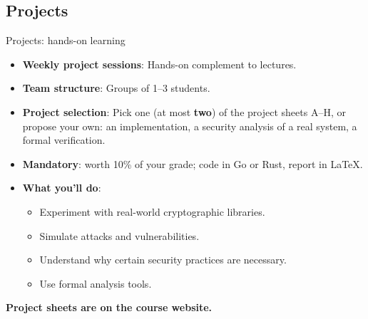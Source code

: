\ifdefined\PRESENTATION\else\PassOptionsToClass{handout}{beamer}\fi\documentclass[aspectratio=169, lualatex]{beamer}
\begin{document}
\subsection{Projects}

\begin{frame}{Projects: hands-on learning}
	\begin{itemize}[<+->]
		\item \textbf{Weekly project sessions}: Hands-on complement to lectures.
		\item \textbf{Team structure}: Groups of 1--3 students.
		\item \textbf{Project selection}: Pick one (at most \textbf{two}) of the project sheets A--H, or propose your own: an implementation, a security analysis of a real system, a formal verification.
		\item \textbf{Mandatory}: worth 10\% of your grade; code in Go or Rust, report in \LaTeX.
		\item \textbf{What you'll do}:
		      \begin{itemize}
			      \item Experiment with real-world cryptographic libraries.
			      \item Simulate attacks and vulnerabilities.
			      \item Understand why certain security practices are necessary.
			      \item Use formal analysis tools.
		      \end{itemize}
	\end{itemize}
	\vspace{0.1cm}
	\begin{center}
		\Large\textcolor{cipherprimary}{\textbf{Project sheets are on the course website.}}
	\end{center}
\end{frame}
\end{document}
